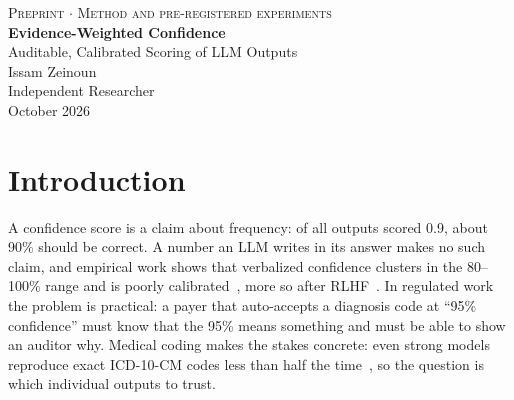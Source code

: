 \documentclass[10pt,letterpaper]{article}
\begin{document}
\thispagestyle{empty}
\begin{center}
{\color{gray}\textsc{Preprint $\cdot$ Method and pre-registered experiments}}\\[14pt]
{\LARGE\bfseries Evidence-Weighted Confidence}\\[4pt]
{\large Auditable, Calibrated Scoring of LLM Outputs}\\[14pt]
{\large Issam Zeinoun~}\\
{Independent Researcher}\\
{October 2026}
\end{center}
\vspace{6pt}

\begin{abstract}
\noindent Organizations that automate decisions with large language models (LLMs) face a basic problem: the confidence a model reports is not a probability. In our tests, when five current models said they were 93--99\% sure that a medical record supported a diagnosis code, they were right only 54--72\% of the time. Evidence-weighted confidence (EWC) fixes this by taking the judgment away from the model. The LLM only reads: it answers a short list of questions derived from the governing rules and quotes the text behind each answer. Code verifies the quotes, and a small logistic regression fitted on about 100 labeled cases turns the answers into a probability that comes with an audit trail.

In three pre-registered studies of ICD-10-CM coding on synthetic charts, ending with 200 held-out cases and five models, EWC's scores of 90\% or more were right 93--100\% of the time on every model, and EWC ranked cases far better than the models' own confidence (AUROC 0.90--1.00 against 0.59--0.77). It also let an inexpensive model match the best frontier result at about one fifteenth of the cost. The charts are synthetic; validation on real records is the next step.

\medskip\noindent\textbf{Keywords:} LLM evaluation; calibration; auditability; logistic regression; medical coding; risk adjustment.
\end{abstract}

\section{Introduction}

A confidence score is a claim about frequency: of all outputs scored 0.9, about 90\% should be correct. A number an LLM writes in its answer makes no such claim, and empirical work shows that verbalized confidence clusters in the 80--100\% range and is poorly calibrated~\cite{xiong}, more so after RLHF~\cite{leng}. In regulated work the problem is practical: a payer that auto-accepts a diagnosis code at ``95\% confidence'' must know that the 95\% means something and must be able to show an auditor why. Medical coding makes the stakes concrete: even strong models reproduce exact ICD-10-CM codes less than half the time~\cite{soroush}, so the question is which individual outputs to trust.
\end{document}
